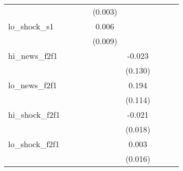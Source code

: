 {\begin{tabular}{l*{8}{c}}
            &                     &                     &                     &     (0.003)         &                     &                     &                     &                     \\
\addlinespace
lo\_shock\_s1 &                     &                     &                     &       0.006         &                     &                     &                     &                     \\
            &                     &                     &                     &     (0.009)         &                     &                     &                     &                     \\
\addlinespace
hi\_news\_f2f1&                     &                     &                     &                     &      -0.023         &                     &                     &                     \\
            &                     &                     &                     &                     &     (0.130)         &                     &                     &                     \\
\addlinespace
lo\_news\_f2f1&                     &                     &                     &                     &       0.194         &                     &                     &                     \\
            &                     &                     &                     &                     &     (0.114)         &                     &                     &                     \\
\addlinespace
hi\_shock\_f2f1&                     &                     &                     &                     &      -0.021         &                     &                     &                     \\
            &                     &                     &                     &                     &     (0.018)         &                     &                     &                     \\
\addlinespace
lo\_shock\_f2f1&                     &                     &                     &                     &       0.003         &                     &                     &                     \\
            &                     &                     &                     &                     &     (0.016)         &                     &                     &                     \\

\end{tabular}}
